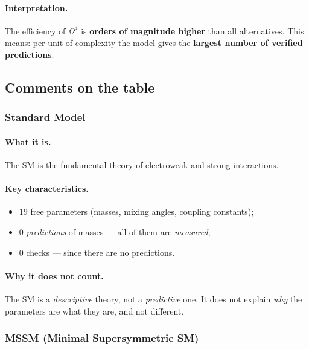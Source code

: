 \documentclass[11pt,a4paper]{article}
\newcommand{\Om}{\Omega^4}
\theoremstyle{definition}
\begin{document}
\paragraph{Interpretation.}
The efficiency of $\Om$ is \textbf{orders of magnitude higher} than all alternatives. 
This means: per unit of complexity the model gives 
the \textbf{largest number of verified predictions}.

\subsection{Comments on the table}
\label{subsec:benchmark-comments}

\subsubsection{Standard Model}

\paragraph{What it is.} 
The SM is the fundamental theory of electroweak and strong 
interactions.

\paragraph{Key characteristics.}
\begin{itemize}
    \item $19$ free parameters (masses, mixing angles, 
          coupling constants);
    \item $0$ \emph{predictions} of masses — all of them are \emph{measured};
    \item $0$ checks — since there are no predictions.
\end{itemize}

\paragraph{Why it does not count.}
The SM is a \emph{descriptive} theory, not a \emph{predictive} one. 
It does not explain \emph{why} the parameters are what they are, and not different.

\subsubsection{MSSM (Minimal Supersymmetric SM)}
\end{document}

